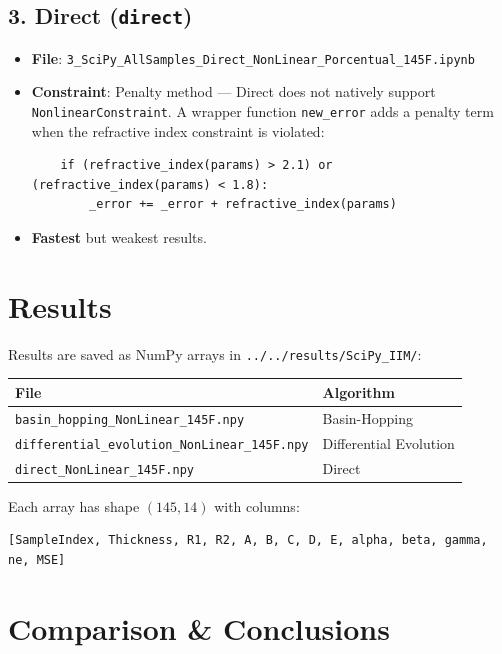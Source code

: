 \documentclass[11pt,a4paper]{article}
\begin{document}
\subsection{3. Direct ({\tt direct})}
\begin{itemize}
    \item \textbf{File}: {\tt 3\_SciPy\_AllSamples\_Direct\_NonLinear\_Porcentual\_145F.ipynb}
    \item \textbf{Constraint}: Penalty method --- Direct does not natively support {\tt NonlinearConstraint}. A wrapper function {\tt new\_error} adds a penalty term when the refractive index constraint is violated:
    \begin{verbatim}
    if (refractive_index(params) > 2.1) or (refractive_index(params) < 1.8):
        _error += _error + refractive_index(params)
    \end{verbatim}
    \item \textbf{Fastest} but weakest results.
\end{itemize}

\section{Results}

Results are saved as NumPy arrays in {\tt ../../results/SciPy\_IIM/}:

\begin{table}[htbp]
\centering
\begin{tabular}{ll}
\toprule
\textbf{File} & \textbf{Algorithm} \\
\midrule
{\tt basin\_hopping\_NonLinear\_145F.npy} & Basin-Hopping \\
{\tt differential\_evolution\_NonLinear\_145F.npy} & Differential Evolution \\
{\tt direct\_NonLinear\_145F.npy} & Direct \\
\bottomrule
\end{tabular}
\end{table}

Each array has shape $(145, 14)$ with columns:
\begin{verbatim}
[SampleIndex, Thickness, R1, R2, A, B, C, D, E, alpha, beta, gamma, ne, MSE]
\end{verbatim}

\section{Comparison \& Conclusions}
\end{document}
